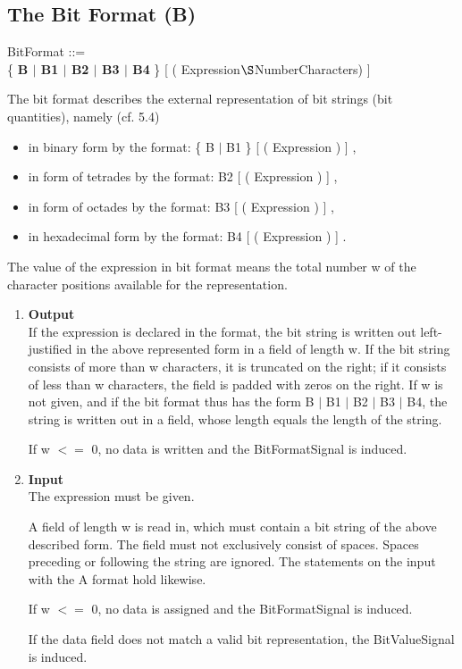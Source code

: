 \subsection{The Bit Format (B)}    %
\label{sec_dation_b_format}

BitFormat ::=\\
\x \{ {\bf B $\mid$ B1 $\mid$ B2 $\mid$ B3 $\mid$ B4} \} [ ( Expression$\S $NumberCharacters) ]

The bit format describes the external representation of bit strings (bit
quantities), namely (cf. 5.4)
\begin{itemize}
\item in binary form by the format: \{ B $\mid$ B1 \} [ ( Expression ) ] ,
\item in form of tetrades by the format: B2 [ ( Expression ) ] ,
\item in form of octades by the format: B3 [ ( Expression ) ] ,
\item in hexadecimal form by the format: B4 [ ( Expression ) ] .
\end{itemize}

The value of the expression in bit format means the total number w of
the character positions available for the representation.
\begin{enumerate}
\item {\bf Output}\\
If the expression is declared in the format, the bit string is written
out left-justified in the above represented form in a field of length
w. If the bit string consists of more than w characters, it is truncated
on the right; if it consists of less than w characters, the field is
padded with zeros on the right. If w is not given, and if the bit format
thus has the form B $\mid$ B1 $\mid$ B2 $\mid$ B3 $\mid$ B4, the string
is written out in a field, whose length equals the length of the
string.

\begin{accepted}
If w $<=$ 0, no data is written and the BitFormatSignal is induced.
\end{accepted}

\item {\bf Input}\\
The expression must be given.

A field of length w is read in, which must contain a bit string of the
above described form. The field must not exclusively consist of spaces.
Spaces preceding or following the string are ignored. The statements on
the input with the A format hold likewise.

\begin{accepted}
If w $<=$ 0, no data is assigned and the BitFormatSignal is induced.

If the data field does not match a valid bit representation, the
BitValueSignal is induced.
\end{accepted}
\end{enumerate}

